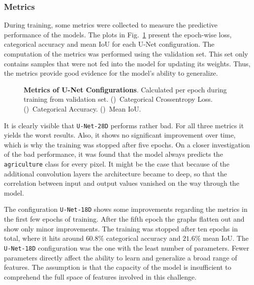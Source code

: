 \subsubsection{Metrics}
During training, some metrics were collected to measure the predictive performance of the models. The plots in Fig.~\ref{fig:unet_train_metrics} present the epoch-wise loss, categorical accuracy and mean IoU for each U-Net configuration. The computation of the metrics was performed using the validation set. This set only contains samples that were not fed into the model for updating its weights. Thus, the metrics provide good evidence for the model's ability to generalize.

\begin{figure}
    \newcommand{\UnetMetricsImageWidth}{0.32\textwidth}
    \centering
    
    \caption[Metrics of U-Net Configurations]
    {\textbf{Metrics of U-Net Configurations}. Calculated per epoch during training from validation set. ()~Categorical Crossentropy Loss. ()~Categorical Accuracy. ()~Mean IoU. }
    \label{fig:unet_train_metrics}
\end{figure}

It is clearly visible that \texttt{U-Net-28D} performs rather bad. For all three metrics it yields the worst results. Also, it shows no significant improvement over time, which is why the training was stopped after five epochs. On a closer investigation of the bad performance, it was found that the model always predicts the \texttt{agriculture} class for every pixel. It might be the case that because of the additional convolution layers the architecture became to deep, so that the correlation between input and output values vanished on the way through the model.

The configuration \texttt{U-Net-18D} shows some improvements regarding the metrics in the first few epochs of training. After the fifth epoch the graphs flatten out and show only minor improvements. The training was stopped after ten epochs in total, where it hits around $60.8\%$ categorical accuracy and $21.6\%$ mean IoU. The \texttt{U-Net-18D} configuration was the one with the least number of parameters. Fewer parameters directly affect the ability to learn and generalize a broad range of features. The assumption is that the capacity of the model is insufficient to comprehend the full space of features involved in this challenge.

